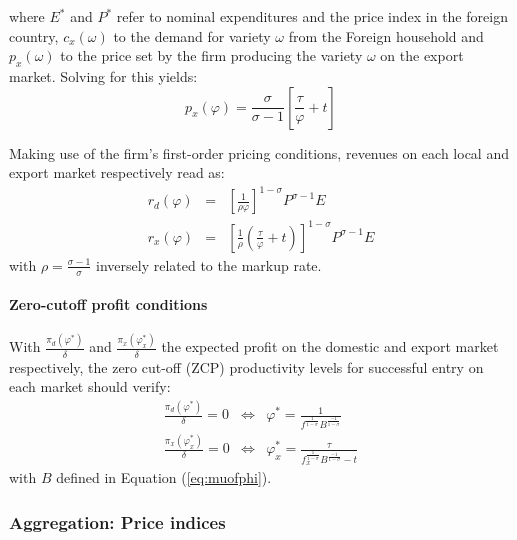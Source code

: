 \documentclass[a4paper,11pt]{article}
\begin{document}
\noindent where $E^\ast$ and $P^\ast$ refer to nominal expenditures and the price index in the foreign country, $c_x(\omega)$ to the demand for variety $\omega$ from the Foreign household and $p_x(\omega)$ to the price set by the firm producing the variety $\omega$ on the export market. Solving for this yields:
\begin{equation}
p_x(\varphi) = \frac{\sigma}{\sigma-1}\left[\frac{\tau}{\varphi} +t \right] \label{eq:px}
\end{equation}

Making use of the firm's first-order pricing conditions, revenues on each local and export market respectively read as:
\begin{eqnarray}
  r_d(\varphi) &=& \left[\frac{1}{\rho \varphi}  \right]^{1-\sigma} P^{\sigma-1} E \label{eq:rd}\\
  r_x(\varphi) &=& \left[\frac{1}{\rho}\left(\frac{\tau}{\varphi} +t\right)  \right]^{1-\sigma} P^{\sigma-1} E \label{eq:rx}
\end{eqnarray}
\noindent with $\rho =  \frac{\sigma-1}{\sigma}$ inversely related to the markup rate.

\paragraph{Zero-cutoff profit conditions} With $\frac{\pi_d(\varphi^\ast)}{\delta}$ and  $\frac{\pi_x(\varphi_x^\ast)}{\delta}$ the expected profit on the domestic and export market respectively, the zero cut-off (ZCP) productivity levels for successful entry on each market should verify:
\begin{eqnarray*}
\frac{\pi_d(\varphi^\ast)}{\delta} = 0 &\Leftrightarrow & \varphi^\ast = \frac{1}{f^{\frac{1}{1-\sigma}}B^{\frac{-1}{1-\sigma}}}\\
\frac{\pi_x(\varphi_x^\ast)}{\delta} = 0 &\Leftrightarrow & \varphi_x^\ast = \frac{\tau}{f_x^{\frac{1}{1-\sigma}}B^{\frac{-1}{1-\sigma}} -t}
\end{eqnarray*}
\noindent with $B$ defined in Equation (\ref{eq:muofphi}).

\subsubsection{Aggregation: Price indices}
\end{document}
